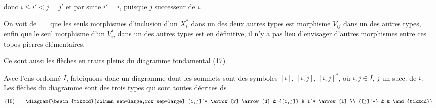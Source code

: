 donc  $i\leq i'<j=j'$ et par suite $i'=i$, puisque $j$ successeur de $i$.

On voit de $=$ que les seuls morphismes d'inclusion d'un $X_i^*$ dans un des deux autres types est
  morphisme  $V_{ij}$ dans un des autres types,  enfin que le seul morphisme d'un $V_{ij}^*$ dans un des autres types est
en définitive, il n'y a pas lieu d'envisager d'autres morphismes entre ces  topos-pierres élémentaires.

Ce sont aussi les  flèches en traits pleins du diagramme fondamental (17)

Avec l'ens ordonné $I$, fabriquons donc un  \uline{diagramme} dont les sommets sont  des symboles  $[i]$, $[i,j]$, $[i,j]^*$, où $i,j\in I$, $j$ un succ. de $i$. Les flèches du diagramme sont des trois types qui sont toutes décrites ds
\[
(19)\qquad
\diagram{\begin{tikzcd}[column sep=large,row sep=large]
[i,j]^* \arrow[r] \arrow[d] & {[i,j]} & i^* \arrow[l] \\
{[j]^*} & &
\end{tikzcd}}
\]

